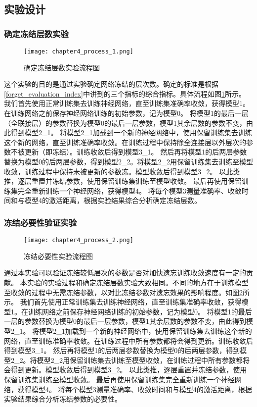 \subsection{实验设计}
\subsubsection{确定冻结层数实验}
\begin{figure}
    \centering
    \texttt{[image: chapter4\_process\_1.png]}
    \caption{确定冻结层数实验流程图}
    \label{fig:chapter4_process_1}
\end{figure}

这个实验的目的是通过实验确定网络冻结的层次数。确定的标准是根据\ref{forget_evaluation_index}中讲到的三个指标的综合指标。具体流程如图\ref{fig:chapter4_process_1}所示。
我们首先使用正常训练集去训练神经网络，直至训练集准确率收敛，获得模型1。在训练网络之前保存神经网络训练的初始参数，记为模型0。
将模型1的最后一层（全联接层）的参数替换为模型0的最后一层参数，模型1其余层数的参数不变，由此得到模型2\_1。
将模型2\_1加载到一个新的神经网络中，使用保留训练集去训练这个新的网络，直至训练准确率收敛。在训练过程中保持除全连接层以外层次的参数不被更新（即冻结）。训练收敛后得到模型3\_1。
然后再将模型1的后两层参数替换为模型0的后两层参数，得到模型2\_2。将模型2\_2用保留训练集去训练至模型收敛，训练过程中保持未被更新的参数冻。模型收敛后得到模型3\_2。
以此类推，逐层重置并冻结参数，使用保留训练集训练至模型收敛。
最后再使用保留训练集完全重新训练一个神经网络，获得模型4。
将每个模型3测量准确率、收敛时间和与模型4的激活距离，根据实验结果综合分析确定冻结层数。

\subsubsection{冻结必要性验证实验}
\begin{figure}
    \centering
    \texttt{[image: chapter4\_process\_2.png]}
    \caption{冻结必要性实验流程图}
    \label{fig:chapter4_process_2}
\end{figure}

通过本实验可以验证冻结较低层次的参数是否对加快遗忘训练收敛速度有一定的贡献。
本实验的实验过程和确定冻结层数实验大致相同。不同的地方在于训练模型至收敛的过程中无需冻结参数，以对比冻结参数对遗忘效果的影响程度。如图\ref{fig:chapter4_process_2}所示。
我们首先使用正常训练集去训练神经网络，直至训练集准确率收敛，获得模型1。在训练网络之前保存神经网络训练的初始参数，记为模型0。
将模型1的最后一层的参数替换为模型0的最后一层参数，模型1其余层数的参数不变，由此得到模型2\_1。
将模型2\_1加载到一个新的神经网络中，使用保留训练集去训练这个新的网络，直至训练准确率收敛。在训练过程中所有参数都将会得到更新。训练收敛后得到模型3\_1。
然后再将模型1的后两层参数替换为模型0的后两层参数，得到模型2\_2。将模型2\_2用保留训练集去训练至模型收敛，在训练过程中所有参数都将会得到更新。模型收敛后得到模型3\_2。
以此类推，逐层重置并冻结参数，使用保留训练集训练至模型收敛。
最后再使用保留训练集完全重新训练一个神经网络，获得模型4。
将每个模型3测量准确率、收敛时间和与模型4的激活距离，根据实验结果综合分析冻结参数的必要性。

